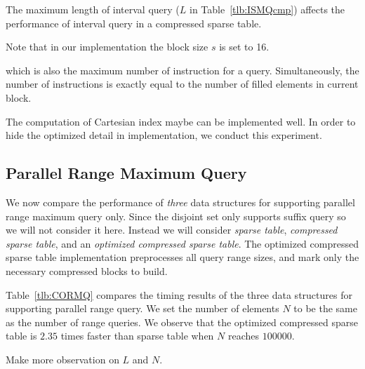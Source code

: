 The maximum length of interval query ($L$ in Table~\ref{tlb:ISMQcmp})
affects the performance of interval query in a compressed sparse
table.

Note that in our implementation the block size $s$ is set to 16.

which is also the maximum number of instruction for a query.
Simultaneously, the number of instructions is exactly equal to the
number of filled elements in current block.


The computation of Cartesian index maybe can be implemented well.  In
order to hide the optimized detail in implementation, we conduct this
experiment.



\subsection{Parallel Range Maximum Query}

We now compare the performance of {\em three} data structures for
supporting parallel range maximum query only.  Since the disjoint set
only supports suffix query so we will not consider it here.  Instead
we will consider {\em sparse table}, {\em compressed sparse table},
and an {\em optimized compressed sparse table}.  The optimized
compressed sparse table implementation preprocesses all query range
sizes, and mark only the necessary compressed blocks to build.

Table~\ref{tlb:CORMQ} compares the timing results of the three data
structures for supporting parallel range query.  We set the number of
elements $N$ to be the same as the number of range queries.  We
observe that the optimized compressed sparse table is $2.35$ times
faster than sparse table when $N$ reaches $100000$.

Make more observation on $L$ and $N$.


